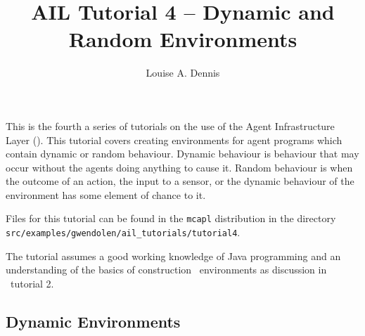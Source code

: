 \documentclass[a4]{article}
\author{Louise A. Dennis}
\title{AIL Tutorial 4 -- Dynamic and Random Environments}
\begin{document}
\maketitle
This is the fourth a series of tutorials on the use of the Agent Infrastructure Layer (\ail).  This tutorial covers creating environments for agent programs which contain dynamic or random behaviour.   Dynamic behaviour is behaviour that may occur without the agents doing anything to cause it.  Random behaviour is when the outcome of an action, the input to a sensor, or the dynamic behaviour of the environment has some element of chance to it.

Files for this tutorial can be found in the \texttt{mcapl} distribution in the directory \texttt{src/examples/gwendolen/ail\_tutorials/tutorial4}.

The tutorial assumes a good working knowledge of Java programming and an understanding of the basics of construction \ail\ environments as discussion in \ail\ tutorial 2.

\subsection{Dynamic Environments}
\end{document}
